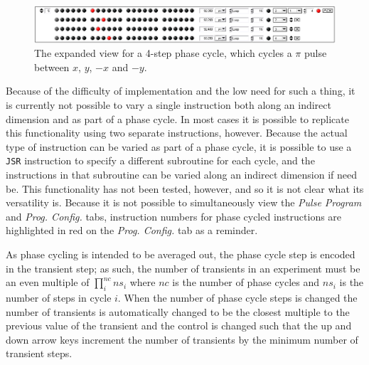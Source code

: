 \documentclass[PaulGanssle-Thesis.tex]{subfiles}
\begin{document}
\begin{figure}[!h]
\includegraphics[width=\tw]{figures/console/PhaseCycledInstruction.png}
\caption{The expanded view for a 4-step phase cycle, which cycles a $\pi$ pulse between $x$, $y$, $-x$ and $-y$.}
\label{fig:PhaseCycleInstructionExpanded}
\end{figure}

Because of the difficulty of implementation and the low need for such a thing, it is currently not possible to vary a single instruction both along an indirect dimension and as part of a phase cycle. In most cases it is possible to replicate this functionality using two separate instructions, however. Because the actual type of instruction can be varied as part of a phase cycle, it is possible to use a \lstinline|JSR| instruction to specify a different subroutine for each cycle, and the instructions in that subroutine can be varied along an indirect dimension if need be. This functionality has not been tested, however, and so it is not clear what its versatility is. Because it is not possible to simultaneously view the \textit{Pulse Program} and \textit{Prog. Config.} tabs, instruction numbers for phase cycled instructions are highlighted in red on the \textit{Prog. Config.} tab as a reminder.

As phase cycling is intended to be averaged out, the phase cycle step is encoded in the transient step; as such, the number of transients in an experiment must be an even multiple of $\prod_{i}^{nc}ns_{i}$ where $nc$ is the number of phase cycles and $ns_{i}$ is the number of steps in cycle $i$. When the number of phase cycle steps is changed the number of transients is automatically changed to be the closest multiple to the previous value of the transient and the control is changed such that the up and down arrow keys increment the number of transients by the minimum number of transient steps.
\end{document}
